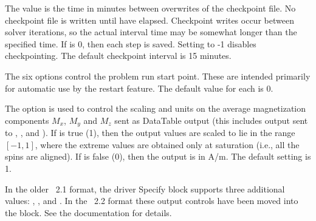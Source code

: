 \begin{description}
The  value is the time in minutes between
overwrites of the checkpoint file.  No checkpoint file is written until
 have elapsed.  Checkpoint writes occur
between solver iterations, so the actual interval time may be somewhat
longer than the specified time.  If  is 0,
then each step is saved.  Setting  to -1
disables checkpointing.  The default checkpoint interval is 15 minutes.

The six  options control the problem run start point.
These are intended primarily for automatic use by the restart feature.
The default value for each is 0.

The  option is used to control the
scaling and units on the average magnetization components $M_x$, $M_y$
and $M_z$ sent as DataTable output (this includes output sent to
,
, and
).  If
 is true (1), then the output values are scaled to lie
in the range $[-1,1]$, where the extreme values are obtained only at
saturation (i.e., all the spins are aligned).  If  is
false (0), then the output is in A/m.  The default setting is 1.

In the older \MIF~2.1 format, the driver Specify block supports three
additional values: ,
, and
.  In the \MIF~2.2 format
these output controls have been moved into the  block.
See the 
documentation for details.


\end{description}
